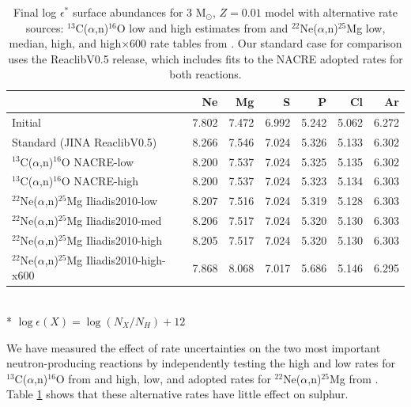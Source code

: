 \begin{table}\centering
  \begin{minipage}{143mm}
  \caption[Final log $\epsilon^*$ surface abundances for 3 M$_\odot$, $Z=0.01$ model with alternative rate sources]{Final log $\epsilon^*$ surface abundances for 3 M$_\odot$, $Z=0.01$ model with alternative rate sources: $^{13}$C($\alpha$,n)$^{16}$O low and high estimates from \citet[][NACRE collaboration]{Angulo:1999kp} and $^{22}$Ne($\alpha$,n)$^{25}$Mg low, median, high, and high$\times600$ rate tables from \citet{Iliadis:2010eu}. Our standard case for comparison uses the ReaclibV0.5 release, which includes fits to the NACRE adopted rates for both reactions.}\label{tbl:neutron-production-surface-results}
\begin{tabular}{l r r r r r r}
		         	 						& Ne   	& Mg   	& S    	& P    	& Cl   	& Ar\\
\hline
Initial			 						& 7.802	& 7.472	& 6.992	& 5.242	& 5.062	& 6.272\\
Standard	(JINA ReaclibV0.5)			  		& 8.266	& 7.546	& 7.024	& 5.326	& 5.133	& 6.302\\
$^{13}$C($\alpha$,n)$^{16}$O NACRE-low 		& 8.200	& 7.537	& 7.024	& 5.325	& 5.135	& 6.302\\
$^{13}$C($\alpha$,n)$^{16}$O NACRE-high		& 8.200	& 7.537	& 7.024	& 5.323	& 5.134	& 6.303\\
$^{22}$Ne($\alpha$,n)$^{25}$Mg Iliadis2010-low 	& 8.207	& 7.516	& 7.024	& 5.319	& 5.128	& 6.303\\
$^{22}$Ne($\alpha$,n)$^{25}$Mg Iliadis2010-med 	& 8.206	& 7.517	& 7.024	& 5.320	& 5.130	& 6.303\\
$^{22}$Ne($\alpha$,n)$^{25}$Mg Iliadis2010-high	& 8.205	& 7.517	& 7.024	& 5.320	& 5.130	& 6.303\\
$^{22}$Ne($\alpha$,n)$^{25}$Mg Iliadis2010-high-x600	& 7.868	&	8.068	&	7.017	&	5.686	&	5.146	&	6.295\\
\hline
\end{tabular}\\
* $\log\epsilon(X) = \log\left(N_X/N_H\right) + 12$
\end{minipage}
\end{table}

We have measured the effect of rate uncertainties on the two most important neutron-producing reactions by independently testing the high and low rates for $^{13}$C($\alpha$,n)$^{16}$O from \citet[][NACRE collaboration]{Angulo:1999kp} and high, low, and adopted rates for $^{22}$Ne($\alpha$,n)$^{25}$Mg from \citet{Iliadis:2010eu}. Table \ref{tbl:neutron-production-surface-results} shows that these alternative rates have little effect on sulphur.

